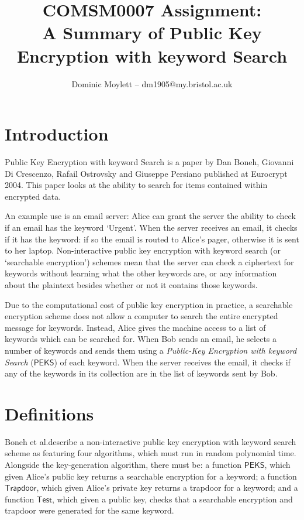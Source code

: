 \documentclass[a4paper,11pt]{article}
\title{COMSM0007 Assignment:\\A Summary of Public Key Encryption with keyword Search}
\author{Dominic Moylett -- dm1905@my.bristol.ac.uk}
\begin{document}
    \maketitle

    \section{Introduction}

    Public Key Encryption with keyword Search \cite{cryptoeprint:2003:195} is a paper by Dan Boneh, Giovanni Di Crescenzo, Rafail Ostrovsky and Giuseppe Persiano published at Eurocrypt 2004. This paper looks at the ability to search for items contained within encrypted data.

    An example use is an email server: Alice can grant the server the ability to check if an email has the keyword `Urgent'. When the server receives an email, it checks if it has the keyword: if so the email is routed to Alice's pager, otherwise it is sent to her laptop. Non-interactive public key encryption with keyword search (or `searchable encryption') schemes mean that the server can check a ciphertext for keywords without learning what the other keywords are, or any information about the plaintext besides whether or not it contains those keywords.

    Due to the computational cost of public key encryption in practice, a searchable encryption scheme does not allow a computer to search the entire encrypted message for keywords. Instead, Alice gives the machine access to a list of keywords which can be searched for. When Bob sends an email, he selects a number of keywords and sends them using a \textit{Public-Key Encryption with keyword Search} ($\mathsf{PEKS}$) of each keyword. When the server receives the email, it checks if any of the keywords in its collection are in the list of keywords sent by Bob.

    \section{Definitions}

    Boneh et al.\@ describe a non-interactive public key encryption with keyword search scheme as featuring four algorithms, which must run in random polynomial time. Alongside the key-generation algorithm, there must be: a function $\mathsf{PEKS}$, which given Alice's public key returns a searchable encryption for a keyword; a function $\mathsf{Trapdoor}$, which given Alice's private key returns a trapdoor for a keyword; and a function $\mathsf{Test}$, which given a public key, checks that a searchable encryption and trapdoor were generated for the same keyword.
\end{document}

